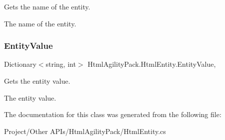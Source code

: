 Gets the name of the entity. 

The name of the entity.\mbox{\label{class_html_agility_pack_1_1_html_entity_af2b170765d77b4c01818806bda5acbf8}} 
\subsubsection{\texorpdfstring{Entity\+Value}{EntityValue}}
{\footnotesize\ttfamily Dictionary$<$string, int$>$ Html\+Agility\+Pack.\+Html\+Entity.\+Entity\+Value\hspace{0.3cm}{\ttfamily [static]}, {\ttfamily [get]}}



Gets the entity value. 

The entity value.

The documentation for this class was generated from the following file\+:\begin{DoxyCompactItemize}
\item 
Project/\+Other A\+P\+Is/\+Html\+Agility\+Pack/Html\+Entity.\+cs\end{DoxyCompactItemize}
